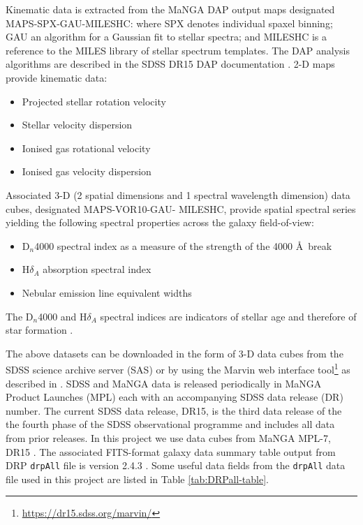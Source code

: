 Kinematic data is extracted from the MaNGA DAP output maps designated MAPS-SPX-GAU-MILESHC: where SPX denotes individual spaxel binning; GAU an algorithm for a  Gaussian fit to stellar spectra; and MILESHC is a reference to the MILES library \citep{2011A&A...532A..95F} of stellar spectrum templates. The DAP analysis algorithms are  described in the SDSS DR15 DAP documentation \citet{2019arXiv190100856W}. 2-D maps provide kinematic data: 

\begin{itemize}
    \item Projected stellar rotation velocity
    \item Stellar velocity dispersion
    \item Ionised gas rotational velocity
    \item Ionised gas velocity dispersion
\end{itemize}

Associated 3-D (2 spatial dimensions and 1 spectral wavelength dimension) data cubes, designated MAPS-VOR10-GAU-
MILESHC, provide spatial spectral series yielding the following spectral properties across the galaxy field-of-view:

\begin{itemize}
    \item D$_n$4000 spectral index as a measure of the strength of the 4000 \AA\ break
    \item H$\delta_A$ absorption spectral index
    \item Nebular emission line equivalent widths
\end{itemize}

The D$_n$4000 and H$\delta_A$ spectral indices are indicators of stellar age and therefore of star formation \citep{1997A&A...325.1025P}. 

The above datasets can be downloaded in the form of 3-D data cubes from the SDSS science archive server (SAS) or by using the Marvin web interface tool\footnote{\href{https://dr15.sdss.org/marvin/}{https://dr15.sdss.org/marvin/}} as described in \cite{2018arXiv181203833C}. SDSS and MaNGA data is released periodically in MaNGA Product Launches (MPL) each with an accompanying SDSS data release (DR) number. The current SDSS data release, DR15, is the third data release of the the fourth phase of the SDSS observational programme and includes all data from prior releases. In this project we use data cubes from MaNGA MPL-7, DR15 \citep{2019ApJS..240...23A}. The associated FITS-format galaxy data summary table output from DRP \texttt{drpAll} file is version 2.4.3 \citep{2016AJ....152...83L}. Some useful data fields from the \texttt{drpAll} data file used in this project are listed in Table \ref{tab:DRPall-table}.

